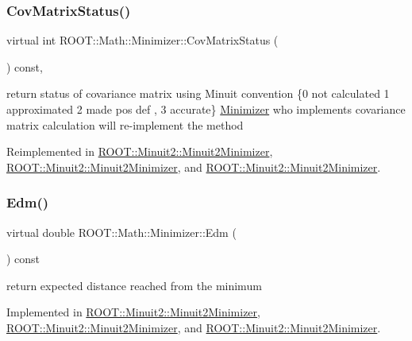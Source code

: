 \subsubsection{\texorpdfstring{CovMatrixStatus()}{CovMatrixStatus()}\hspace{0.1cm}{\footnotesize\ttfamily [3/3]}}
{\footnotesize\ttfamily virtual int R\+O\+O\+T\+::\+Math\+::\+Minimizer\+::\+Cov\+Matrix\+Status (\begin{DoxyParamCaption}{ }\end{DoxyParamCaption}) const\hspace{0.3cm}{\ttfamily [inline]}, {\ttfamily [virtual]}}

return status of covariance matrix using Minuit convention \{0 not calculated 1 approximated 2 made pos def , 3 accurate\} \mbox{\hyperlink{classROOT_1_1Math_1_1Minimizer}{Minimizer}} who implements covariance matrix calculation will re-\/implement the method 

Reimplemented in \mbox{\hyperlink{classROOT_1_1Minuit2_1_1Minuit2Minimizer_ad9f4873b9651626d2b83cf7eab826b0f}{R\+O\+O\+T\+::\+Minuit2\+::\+Minuit2\+Minimizer}}, \mbox{\hyperlink{classROOT_1_1Minuit2_1_1Minuit2Minimizer_ad9f4873b9651626d2b83cf7eab826b0f}{R\+O\+O\+T\+::\+Minuit2\+::\+Minuit2\+Minimizer}}, and \mbox{\hyperlink{classROOT_1_1Minuit2_1_1Minuit2Minimizer_ad9f4873b9651626d2b83cf7eab826b0f}{R\+O\+O\+T\+::\+Minuit2\+::\+Minuit2\+Minimizer}}.

\mbox{\label{classROOT_1_1Math_1_1Minimizer_a990c6935849a3fb31aedab1df6c26f28}} 
\subsubsection{\texorpdfstring{Edm()}{Edm()}\hspace{0.1cm}{\footnotesize\ttfamily [1/3]}}
{\footnotesize\ttfamily virtual double R\+O\+O\+T\+::\+Math\+::\+Minimizer\+::\+Edm (\begin{DoxyParamCaption}{ }\end{DoxyParamCaption}) const\hspace{0.3cm}{\ttfamily [pure virtual]}}



return expected distance reached from the minimum 



Implemented in \mbox{\hyperlink{classROOT_1_1Minuit2_1_1Minuit2Minimizer_ab9c1bfaaaf4c12acd1fd96ece3509269}{R\+O\+O\+T\+::\+Minuit2\+::\+Minuit2\+Minimizer}}, \mbox{\hyperlink{classROOT_1_1Minuit2_1_1Minuit2Minimizer_ab9c1bfaaaf4c12acd1fd96ece3509269}{R\+O\+O\+T\+::\+Minuit2\+::\+Minuit2\+Minimizer}}, and \mbox{\hyperlink{classROOT_1_1Minuit2_1_1Minuit2Minimizer_ab9c1bfaaaf4c12acd1fd96ece3509269}{R\+O\+O\+T\+::\+Minuit2\+::\+Minuit2\+Minimizer}}.

